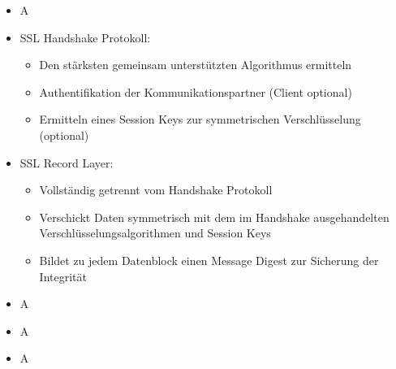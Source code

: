\begin{itemize}
    \item \todo A
\end{itemize}

\begin{itemize}
    \item SSL Handshake Protokoll:
    \begin{itemize}
        \item Den stärksten gemeinsam unterstützten Algorithmus ermitteln
        \item Authentifikation der Kommunikationspartner (Client optional)
        \item Ermitteln eines Session Keys zur symmetrischen Verschlüsselung (optional)
    \end{itemize}
    \item SSL Record Layer:
    \begin{itemize}
        \item Vollständig getrennt vom Handshake Protokoll
        \item Verschickt Daten symmetrisch mit dem im Handshake ausgehandelten Verschlüsselungsalgorithmen und Session Keys
        \item Bildet zu jedem Datenblock einen Message Digest zur Sicherung der Integrität
    \end{itemize}
\end{itemize}

\begin{itemize}
    \item \todo A
\end{itemize}

\begin{itemize}
    \item \todo A
\end{itemize}

\begin{itemize}
    \item \todo A
\end{itemize}

